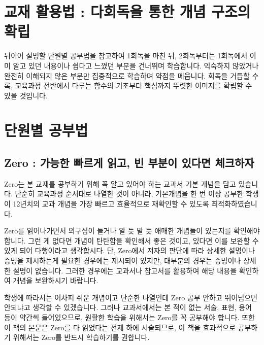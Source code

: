

\section{교재 활용법 : 다회독을 통한 개념 구조의 확립}
뒤이어 설명할 단원별 공부법을 참고하여 1회독을 마친 뒤, 2회독부터는 1회독에서 이미 알고 있던 내용이나 쉽다고 느꼈던 부분을 건너뛰며 학습합니다. 익숙하지 않았거나 완전히 이해되지 않은 부분만 집중적으로 학습하며 약점을 메웁니다. 회독을 거듭할 수록, 교육과정 전반에서 다루는 함수의 기초부터 핵심까지 뚜렷한 이미지를 확립할 수 있을 것입니다.

\section{단원별 공부법}

\subsection{Zero : 가능한 빠르게 읽고, 빈 부분이 있다면 체크하자}
Zero는 본 교재를 공부하기 위해 꼭 알고 있어야 하는 교과서 기본 개념을 담고 있습니다. 단순히 교육과정 순서대로 나열한 것이 아니라, 기본개념을 한 번 이상 공부한 학생이 12년치의 교과 개념을 가장 빠르고 효율적으로 재확인할 수 있도록 최적화하였습니다.

Zero를 읽어나가면서 의구심이 들거나 알 듯 말 듯 애매한 개념들이 있는지를 확인해야 합니다. 그런 게 없다면 개념이 탄탄함을 확인해서 좋은 것이고, 있다면 이를 보완할 수 있게 되어 다행이라고 생각합시다. 단, Zero에서 저자의 판단에 따라 상세한 설명이나 증명을 제시하는게 필요한 경우에는 제시되어 있지만, 대부분의 경우는 증명이나 상세한 설명이 없습니다. 그러한 경우에는 교과서나 참고서를 활용하여 해당 내용을 확인하여 개념을 보완하시기 바랍니다.

학생에 따라서는 어차피 쉬운 개념이고 단순한 나열인데 Zero 공부 안하고 뛰어넘으면 안되냐고 생각할 수 있겠습니다. 그러나 교과서에서는 본 적이 없는 서술, 표현, 용어 등이 약간씩 들어있으므로, 원활한 학습을 위해서는 Zero를 꼭 공부해야 합니다.  또한 이 책의 본문은 Zero를 다 읽었다는 전제 하에 서술되므로, 이 책을 효과적으로 공부하기 위해서는 Zero를 반드시 학습하기를 권합니다.

